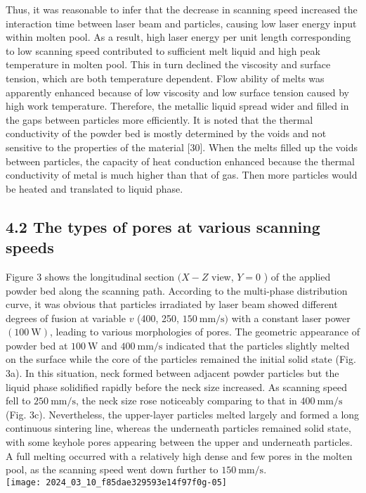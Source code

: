\documentclass[10pt]{article}
\begin{document}
Thus, it was reasonable to infer that the decrease in scanning speed increased the interaction time between laser beam and particles, causing low laser energy input within molten pool. As a result, high laser energy per unit length corresponding to low scanning speed contributed to sufficient melt liquid and high peak temperature in molten pool. This in turn declined the viscosity and surface tension, which are both temperature dependent. Flow ability of melts was apparently enhanced because of low viscosity and low surface tension caused by high work temperature. Therefore, the metallic liquid spread wider and filled in the gaps between particles more efficiently. It is noted that the thermal conductivity of the powder bed is mostly determined by the voids and not sensitive to the properties of the material [30]. When the melts filled up the voids between particles, the capacity of heat conduction enhanced because the thermal conductivity of metal is much higher than that of gas. Then more particles would be heated and translated to liquid phase.

\subsection*{4.2 The types of pores at various scanning speeds}
Figure 3 shows the longitudinal section $(X-Z$ view, $Y=0$ ) of the applied powder bed along the scanning path. According to the multi-phase distribution curve, it was obvious that particles irradiated by laser beam showed different degrees of fusion at variable $v$ (400, 250, $150 \mathrm{~mm} / \mathrm{s})$ with a constant laser power $(100 \mathrm{~W})$, leading to various morphologies of pores. The geometric appearance of powder bed at $100 \mathrm{~W}$ and $400 \mathrm{~mm} / \mathrm{s}$ indicated that the particles slightly melted on the surface while the core of the particles remained the initial solid state (Fig. 3a). In this situation, neck formed between adjacent powder particles but the liquid phase solidified rapidly before the neck size increased. As scanning speed fell to $250 \mathrm{~mm} / \mathrm{s}$, the neck size rose noticeably comparing to that in $400 \mathrm{~mm} / \mathrm{s}$ (Fig. 3c). Nevertheless, the upper-layer particles melted largely and formed a long continuous sintering line, whereas the underneath particles remained solid state, with some keyhole pores appearing between the upper and underneath particles. A full melting occurred with a relatively high dense and few pores in the molten pool, as the scanning speed went down further to $150 \mathrm{~mm} / \mathrm{s}$.\\
\texttt{[image: 2024\_03\_10\_f85dae329593e14f97f0g-05]}
\end{document}
